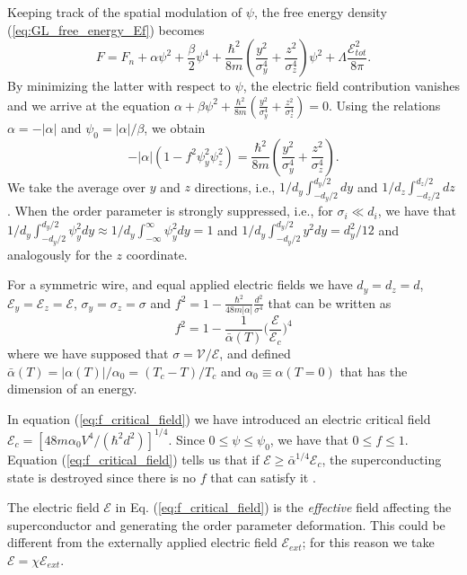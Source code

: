 \documentclass[prl,twocolumn,reprint,graphicx,showpacs,superscriptaddress,floatfix]{revtex4-1}
\newcommand{\mathE}{\mathcal{E} }
\begin{document}
Keeping track of the spatial modulation of $\psi$, the free energy density (\ref{eq:GL_free_energy_Ef}) becomes
\begin{equation}
F = F_n + \alpha \psi^2 + \frac{\beta}{2} \psi^4 + \frac{\hbar^2}{8 m } \left(\frac{y^2}{ \sigma_y^4} + \frac{z^2}{ \sigma_z^4}\right) \psi^2 + \Lambda \frac{\mathE_{tot}^2}{8 \pi} .
\end{equation}
By minimizing the latter with respect to $\psi$, the electric field contribution vanishes and we arrive at the equation $ \alpha + \beta \psi^2 + \frac{\hbar^2}{8 m } \left(\frac{y^2}{ \sigma_y^4} + \frac{z^2}{ \sigma_z^4}\right)=0$. Using the relations $\alpha = - |\alpha|$ and  $\psi_0 = |\alpha|/\beta$, we obtain
\begin{equation}
 -|\alpha| (1-  f^2 \psi_y^2 \psi_z^2) = \frac{\hbar^2}{8 m } \left(\frac{y^2}{ \sigma_y^4} + \frac{z^2}{ \sigma_z^4}\right).
\end{equation}
We take the average over $y$ and $z$ directions, i.e., $1/d_y \int_{-d_y/2}^{d_y/2} dy$ and $1/d_z \int_{-d_z/2}^{d_z/2} dz$ .
When the order parameter is strongly suppressed, i.e., 
for $\sigma_i \ll d_i$, we have that $1/d_y \int_{-d_y/2}^{d_y/2}  \psi_y^2 dy\approx 1/d_y \int_{-\infty}^{\infty}  \psi_y^2 dy=1$ and $1/d_y \int_{-d_y/2}^{d_y/2}  y^2 dy =d_y^2/12$ and analogously for the $z$ coordinate. 

For a symmetric wire, and equal applied electric fields we have  $d_y=d_z=d$, $\mathE_y=\mathE_z=\mathE$, $\sigma_y=\sigma_z=\sigma$ and $f^2 = 1- \frac{\hbar^2}{48 m |\alpha|} \frac{d^2}{ \sigma^4}$ that can be written as 
\begin{equation}
f^2 =  1- \frac{1}{\bar{\alpha}(T)}\Big( \frac{\mathE}{\mathE_c}\Big)^4 
\label{eq:f_critical_field}
\end{equation}
where we have supposed that $\sigma = \mathcal{V}/\mathE$, and defined $\bar{\alpha}(T) = |\alpha (T)|/\alpha_0 = (T_c-T)/T_c$ and $\alpha_0 \equiv \alpha(T=0)$ that has the dimension of an energy.

In equation (\ref{eq:f_critical_field}) we have introduced an electric critical field $\mathE_c = [48 m \alpha_0 V^4/(\hbar^2 d^2)]^{1/4}$.
Since $0 \leq \psi \leq \psi_0$, we have that $0 \leq f \leq 1$. Equation (\ref{eq:f_critical_field}) tells us that if $\mathE \geq \bar{\alpha}^{1/4} \mathE_c $, the superconducting state is destroyed since there is no $f$ that can satisfy it
\cite{degennes_SI, schmidt1997physics_SI}.

The electric field $\mathE$ in Eq. (\ref{eq:f_critical_field}) is the \emph{effective} field affecting the superconductor and generating the order parameter deformation.
This could be different from the externally applied electric field $\mathE_{ext}$; for this reason we take $\mathE = \chi \mathE_{ext}$.
\end{document}
